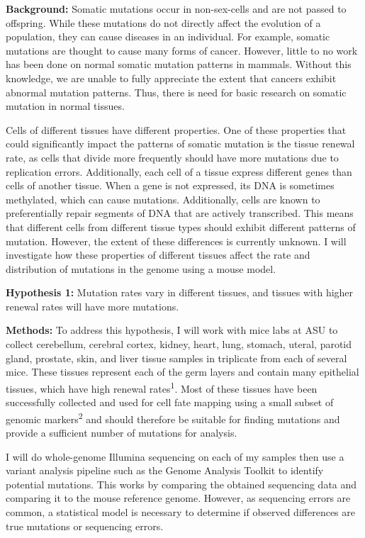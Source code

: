 \documentclass[12pt]{article}
\begin{document}
\noindent
\textbf{Background:}
Somatic mutations occur in non-sex-cells and are not passed to offspring.
While these mutations do not directly affect the evolution of a population, they can cause diseases in an individual.
For example, somatic mutations are thought to cause many forms of cancer.
However, little to no work has been done on normal somatic mutation patterns in mammals.
Without this knowledge, we are unable to fully appreciate the extent that cancers exhibit abnormal mutation patterns.
Thus, there is need for basic research on somatic mutation in normal tissues.

Cells of different tissues have different properties.
One of these properties that could significantly impact the patterns of somatic mutation is the tissue renewal rate, as cells that divide more frequently should have more mutations due to replication errors.
Additionally, each cell of a tissue express different genes than cells of another tissue.
When a gene is not expressed, its DNA is sometimes methylated, which can cause mutations.
Additionally, cells are known to preferentially repair segments of DNA that are actively transcribed.
This means that different cells from different tissue types should exhibit different patterns of mutation.
However, the extent of these differences is currently unknown.
I will investigate how these properties of different tissues affect the rate and distribution of mutations in the genome using a mouse model.

\textbf{Hypothesis 1:}
Mutation rates vary in different tissues, and tissues with higher renewal rates will have more mutations.

\textbf{Methods:}
To address this hypothesis, I will work with mice labs at ASU to collect cerebellum, cerebral cortex, kidney, heart, lung, stomach, uteral, parotid gland, prostate, skin, and liver tissue samples in triplicate from each of several mice.
These tissues represent each of the germ layers and contain many epithelial tissues, which have high renewal rates\textsuperscript{1}.
Most of these tissues have been successfully collected and used for cell fate mapping using a small subset of genomic markers\textsuperscript{2} and should therefore be suitable for finding mutations and provide a sufficient number of mutations for analysis.

I will do whole-genome Illumina sequencing on each of my samples then use a variant analysis pipeline such as the Genome Analysis Toolkit to identify potential mutations.
This works by comparing the obtained sequencing data and comparing it to the mouse reference genome.
However, as sequencing errors are common, a statistical model is necessary to determine if observed differences are true mutations or sequencing errors.
\end{document}
